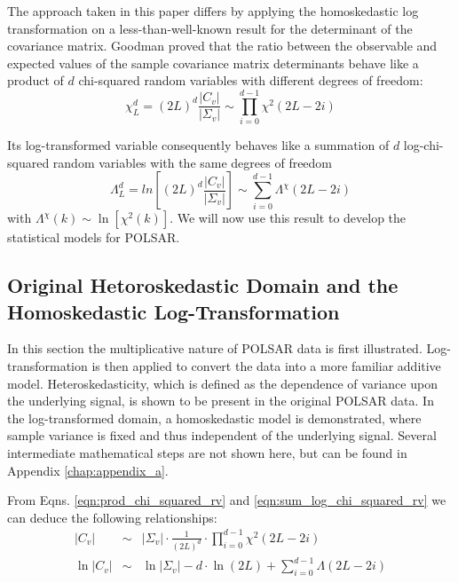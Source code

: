 \documentclass[journal,12pt,draftcls,onecolumn]{IEEEtran}
\begin{document}
The approach taken in this paper differs by applying the homoskedastic log transformation  on a less-than-well-known result for the determinant of the covariance matrix.
Goodman \cite{Goodman_1963_AMS_178} proved
that the ratio between the observable and expected values of the sample covariance matrix determinants
  behave like a product of $d$ chi-squared random variables with different degrees of freedom: 
\begin{equation}
\chi^d_L = (2L)^d \frac{|C_v|}{|\Sigma_v|} \sim \prod_{i=0}^{d-1} \chi^2 (2L-2i)
\label{eqn:prod_chi_squared_rv}  
\end{equation}

Its log-transformed variable consequently 
  behaves like a summation of $d$ log-chi-squared random variables with the same degrees of freedom  
\begin{equation}
\Lambda^d_L = ln \left[ (2L)^d \frac{|C_v|}{|\Sigma_v|} \right] \sim \sum_{i=0}^{d-1} \Lambda^\chi (2L-2i)
\label{eqn:sum_log_chi_squared_rv}
\end{equation}
with
  $\Lambda^\chi (k) \sim \ln \left[ \chi^2 (k) \right]$.
We will now use this result to develop the statistical models for POLSAR. %



\subsection{Original Hetoroskedastic Domain and the Homoskedastic Log-Transformation}
\label{sec:polsar_heterosked_model_and_log_transform}

In this section the multiplicative nature of POLSAR data is first illustrated.
 Log-transformation is then applied to convert  the data into a more familiar additive model.
Heteroskedasticity, which is defined as the dependence of variance upon the underlying signal,
  is shown to be present in the original POLSAR data.
In the log-transformed domain, a homoskedastic model is demonstrated,
  where sample variance is fixed and thus independent of the underlying signal.
Several intermediate mathematical steps are not shown here, but can be found in Appendix \ref{chap:appendix_a}.
  
From Eqns. \ref{eqn:prod_chi_squared_rv} and \ref{eqn:sum_log_chi_squared_rv}
we can deduce the following relationships:
\begin{eqnarray}
  |C_v| &\sim& |\Sigma_v| \cdot \frac{1}{(2L)^d} \cdot \prod_{i=0}^{d-1} \chi^2 (2L-2i) \label{eqn:determinant_distribution} \\
  \ln|C_v| &\sim& \ln|\Sigma_v| - d \cdot \ln(2L) + \sum^{d-1}_{i=0} \Lambda(2L-2i)
\label{eqn:log_determinant_distribution}  
\end{eqnarray}
\end{document}
